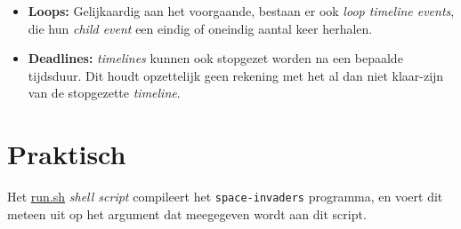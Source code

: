 \documentclass[10pt,a4paper]{article}
\begin{document}
\begin{itemize}
\begin{itemize}
\item \textbf{Loops:} Gelijkaardig aan het voorgaande, bestaan er ook
\emph{loop timeline events}, die hun \emph{child event} een eindig of
oneindig aantal keer herhalen.

\item \textbf{Deadlines:} \emph{timelines} kunnen ook stopgezet worden na
een bepaalde tijdsduur. Dit houdt opzettelijk geen rekening met het
al dan niet klaar-zijn van de stopgezette \emph{timeline}.

\end{itemize}

\end{itemize}

\section{Praktisch}

Het \url{run.sh} \emph{shell script} compileert het 
\texttt{space-invaders} programma, en
voert dit meteen uit op het argument dat meegegeven wordt aan dit
script.
\end{document}
